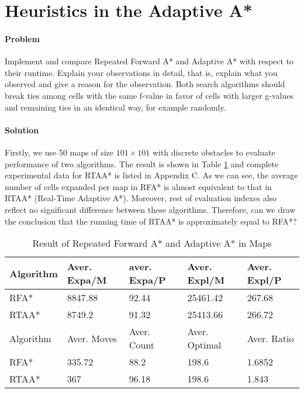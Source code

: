 \section{Heuristics in the Adaptive A*}

\paragraph{Problem}
Implement and compare Repeated Forward A* and Adaptive A* with respect to their
runtime. Explain your observations in detail, that is, explain what you
observed and give a reason for the observation. Both search algorithms should
break ties among cells with the same f-value in favor of cells with larger
g-values and remaining ties in an identical way, for example randomly.

\paragraph{Solution}
Firstly, we use 50 maps of size $101\times 101$ with discrete obstacles to
evaluate performance of two algorithms. The result is shown in Table
\ref{tbl:rpa-rtaa} and complete experimental data for RTAA* is listed in
Appendix C. As we can see, the average number of cells expanded per map in RFA*
is almost equivalent to that in RTAA* (Real-Time Adaptive A*).  Moreover, rest
of evaluation indexes also reflect no significant difference between these
algorithms. Therefore, can we draw the conclusion that the running time of
RTAA* is approximately equal to RFA*?

\begin{table}[ht]
\centering
\caption{Result of Repeated Forward A* and Adaptive A* in Maps}
\begin{tabular}{|l|l|l|l|l|}
\hline
Algorithm & Aver. Expa/M & aver. Expa/P & Aver. Expl/M & Aver. Expl/P \\
\hline
RFA* & 8847.88 & 92.44 & 25461.42 & 267.68 \\
\hline
RTAA* & 8749.2 & 91.32 & 25413.66 & 266.72 \\
\hhline{|=|=|=|=|=|}
Algorithm & Aver. Moves & Aver. Count & Aver. Optimal & Aver. Ratio \\
\hline
RFA* & 335.72 & 88.2 & 198.6 & 1.6852 \\
\hline
RTAA* & 367 & 96.18 & 198.6 & 1.843 \\
\hline
\end{tabular}
\label{tbl:rpa-rtaa}
\end{table}

